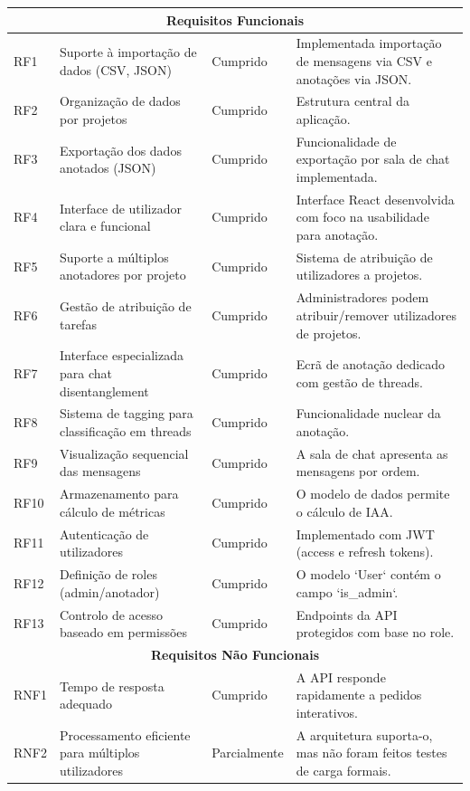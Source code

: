 \begin{longtable}{|p{}|p{}|p{}|p{}|}
    \multicolumn{4}{|c|}{\textbf{Requisitos Funcionais}} \\
    \hline
    RF1 & Suporte à importação de dados (CSV, JSON) & Cumprido & Implementada importação de mensagens via CSV e anotações via JSON. \\
    \hline
    RF2 & Organização de dados por projetos & Cumprido & Estrutura central da aplicação. \\
    \hline
    RF3 & Exportação dos dados anotados (JSON) & Cumprido & Funcionalidade de exportação por sala de chat implementada. \\
    \hline
    RF4 & Interface de utilizador clara e funcional & Cumprido & Interface React desenvolvida com foco na usabilidade para anotação. \\
    \hline
    RF5 & Suporte a múltiplos anotadores por projeto & Cumprido & Sistema de atribuição de utilizadores a projetos. \\
    \hline
    RF6 & Gestão de atribuição de tarefas & Cumprido & Administradores podem atribuir/remover utilizadores de projetos. \\
    \hline
    RF7 & Interface especializada para chat disentanglement & Cumprido & Ecrã de anotação dedicado com gestão de threads. \\
    \hline
    RF8 & Sistema de tagging para classificação em threads & Cumprido & Funcionalidade nuclear da anotação. \\
    \hline
    RF9 & Visualização sequencial das mensagens & Cumprido & A sala de chat apresenta as mensagens por ordem. \\
    \hline
    RF10 & Armazenamento para cálculo de métricas & Cumprido & O modelo de dados permite o cálculo de IAA. \\
    \hline
    RF11 & Autenticação de utilizadores & Cumprido & Implementado com JWT (access e refresh tokens). \\
    \hline
    RF12 & Definição de roles (admin/anotador) & Cumprido & O modelo `User` contém o campo `is\_admin`. \\
    \hline
    RF13 & Controlo de acesso baseado em permissões & Cumprido & Endpoints da API protegidos com base no role. \\
    \hline
    \multicolumn{4}{|c|}{\textbf{Requisitos Não Funcionais}} \\
    \hline
    RNF1 & Tempo de resposta adequado & Cumprido & A API responde rapidamente a pedidos interativos. \\
    \hline
    RNF2 & Processamento eficiente para múltiplos utilizadores & Parcialmente & A arquitetura suporta-o, mas não foram feitos testes de carga formais. \\

\end{longtable}
